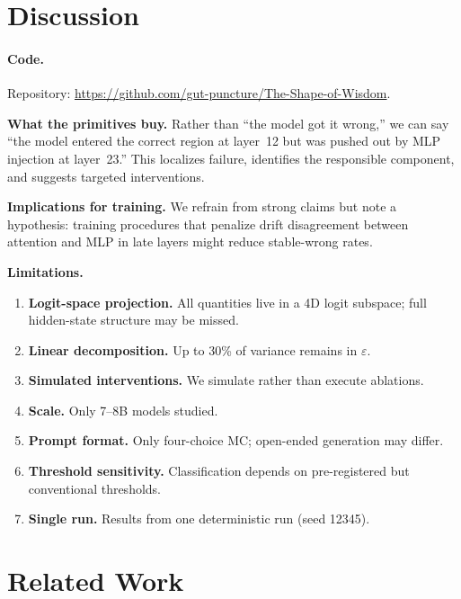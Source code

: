 \documentclass{article}
\begin{document}
\section{Discussion}
\label{sec:discussion}

\paragraph{Code.}  Repository: \url{https://github.com/gut-puncture/The-Shape-of-Wisdom}.

\textbf{What the primitives buy.}  Rather than ``the model got it wrong,'' we can say ``the model entered the correct region at layer~12 but was pushed out by MLP injection at layer~23.''  This localizes failure, identifies the responsible component, and suggests targeted interventions.

\textbf{Implications for training.}  We refrain from strong claims but note a hypothesis: training procedures that penalize drift disagreement between attention and MLP in late layers might reduce stable-wrong rates.

\textbf{Limitations.}
\vspace{-0.5em}
\begin{enumerate}\setlength{\itemsep}{0pt}
\item \textbf{Logit-space projection.}  All quantities live in a 4D logit subspace; full hidden-state structure may be missed.
\item \textbf{Linear decomposition.}  Up to 30\% of variance remains in $\varepsilon$.
\item \textbf{Simulated interventions.}  We simulate rather than execute ablations.
\item \textbf{Scale.}  Only 7--8B models studied.
\item \textbf{Prompt format.}  Only four-choice MC; open-ended generation may differ.
\item \textbf{Threshold sensitivity.}  Classification depends on pre-registered but conventional thresholds.
\item \textbf{Single run.}  Results from one deterministic run (seed 12345).
\end{enumerate}


\section{Related Work}
\end{document}
